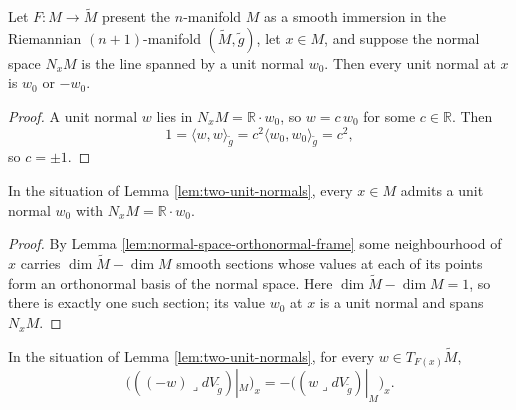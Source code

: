 \begin{lemma}
\label{lem:two-unit-normals}
\leanok
{}
Let $F : M \to \tilde M$ present the $n$-manifold $M$ as a smooth immersion in the Riemannian
$(n+1)$-manifold $(\tilde M, \tilde g)$, let $x \in M$, and suppose the normal space $N_x M$ is
the line spanned by a unit normal $w_0$. Then every unit normal at $x$ is $w_0$ or $-w_0$.
\end{lemma}

\begin{proof}
\leanok
{}
A unit normal $w$ lies in $N_x M = \mathbb{R} \cdot w_0$, so $w = c\, w_0$ for some
$c \in \mathbb{R}$. Then
\[
  1 = \langle w, w \rangle_{\tilde g} = c^2 \langle w_0, w_0 \rangle_{\tilde g} = c^2,
\]
so $c = \pm 1$.
\end{proof}

\begin{lemma}
\label{lem:pointwise-unit-normal-span}
\leanok
{}
In the situation of Lemma \ref{lem:two-unit-normals}, every $x \in M$ admits a unit normal $w_0$
with $N_x M = \mathbb{R} \cdot w_0$.
\end{lemma}

\begin{proof}
\leanok
{}
By Lemma \ref{lem:normal-space-orthonormal-frame} some neighbourhood of $x$ carries
$\dim \tilde M - \dim M$ smooth sections whose values at each of its points form an orthonormal
basis of the normal space. Here $\dim \tilde M - \dim M = 1$, so there is exactly one such
section; its value $w_0$ at $x$ is a unit normal and spans $N_x M$.
\end{proof}

\begin{lemma}
\label{lem:normal-restrict-neg-normal}
\leanok
{}
In the situation of Lemma \ref{lem:two-unit-normals}, for every $w \in T_{F(x)}\tilde M$,
\[
  \bigl(((-w) \lrcorner dV_{\tilde g})|_M\bigr)_x = -\bigl((w \lrcorner dV_{\tilde g})|_M\bigr)_x .
\]
\end{lemma}

